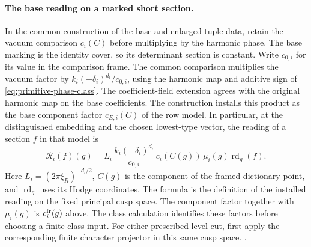 \paragraph{The base reading on a marked short section.}
In the common construction of the base and enlarged tuple data,
retain the vacuum comparison \(c_i(C)\) before
multiplying by the harmonic phase. The base marking is the
identity cover, so its determinant section is constant. Write
\(c_{0,i}\) for its value in the comparison frame. The common
comparison multiplies the vacuum factor by
\(k_i(-\delta_i)^{d_i}/c_{0,i}\), using the harmonic map and
additive sign of \eqref{eq:primitive-phase-class}. The
coefficient-field extension agrees with the original harmonic
map on the base coefficients. The construction installs this
product as the base component factor \(c_{E,i}(C)\) of the
row model. In particular, at the distinguished embedding and
the chosen lowest-type vector, the reading of a section \(f\)
in that model is
\begin{equation}
 \mathcal R_i(f)(g)=L_i\,
   \frac{k_i(-\delta_i)^{d_i}}{c_{0,i}}\,
   c_i(C(g))\,\mu_i(g)\operatorname{rd}_{g}(f).
 \label{eq:stage-marked-read}
\end{equation}
Here \(L_i=(2\pi\xi_R)^{-d_i/2}\), \(C(g)\) is the component
of the framed dictionary point, and \(\operatorname{rd}_g\)
uses its Hodge coordinates. The formula is the definition
of the installed reading on the fixed principal cusp space.
The component factor together with \(\mu_i(g)\) is
\(c_i^{\rm fr}(g)\) above. The class calculation identifies
these factors before choosing a finite class input. For either
prescribed level cut, first apply the corresponding finite
character projector in this same cusp space.
.

